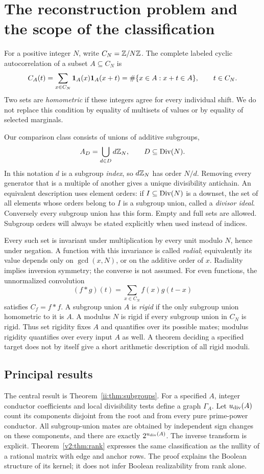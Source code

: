 \section{The reconstruction problem and the scope of the classification}\label{v2:sec:intro}
For a positive integer $N$, write $C_N=\mathbb Z/N\mathbb Z$. The complete labeled cyclic autocorrelation of a subset $A\subseteq C_N$ is
\begin{equation}\label{ii:eq:corr}
 C_A(t)=\sum_{x\in C_N}\mathbf1_A(x)\mathbf1_A(x+t)
       =\#\{x\in A:x+t\in A\},\qquad t\in C_N.
\end{equation}
Two sets are \emph{homometric} if these integers agree for every individual shift. We do not replace this condition by equality of multisets of values or by equality of selected marginals.

Our comparison class consists of unions of additive subgroups,
\begin{equation}\label{v2:eq:AD}
 A_D=\bigcup_{d\in D}d\mathbb Z_N,\qquad D\subseteq\operatorname{Div}(N).
\end{equation}
In this notation $d$ is a subgroup \emph{index}, so $d\mathbb Z_N$ has order $N/d$. Removing every generator that is a multiple of another gives a unique divisibility antichain. An equivalent description uses element orders: if $I\subseteq\operatorname{Div}(N)$ is a downset, the set of all elements whose orders belong to $I$ is a subgroup union, called a \emph{divisor ideal}. Conversely every subgroup union has this form. Empty and full sets are allowed. Subgroup orders will always be stated explicitly when used instead of indices.

Every such set is invariant under multiplication by every unit modulo $N$, hence under negation. A function with this invariance is called \emph{radial}; equivalently its value depends only on $\gcd(x,N)$, or on the additive order of $x$. Radiality implies inversion symmetry; the converse is not assumed. For even functions, the unnormalized convolution
\[
 (f*g)(t)=\sum_{x\in C_N}f(x)g(t-x)
\]
satisfies $C_f=f*f$. A subgroup union $A$ is \emph{rigid} if the only subgroup union homometric to it is $A$. A modulus $N$ is rigid if every subgroup union in $C_N$ is rigid. Thus set rigidity fixes $A$ and quantifies over its possible mates; modulus rigidity quantifies over every input $A$ as well. A theorem deciding a specified target does not by itself give a short arithmetic description of all rigid moduli.

\subsection{Principal results}
The central result is Theorem~\ref{ii:thm:subgroups}. For a specified $A$, integer conductor coefficients and local divisibility tests define a graph $\Gamma_A$. Let $u_{\rm div}(A)$ count its components disjoint from the root and from every pure prime-power conductor. All subgroup-union mates are obtained by independent sign changes on these components, and there are exactly $2^{u_{\rm div}(A)}$. The inverse transform is explicit. Theorem~\ref{v2:thm:rank} expresses the same classification as the nullity of a rational matrix with edge and anchor rows. The proof explains the Boolean structure of its kernel; it does not infer Boolean realizability from rank alone.

